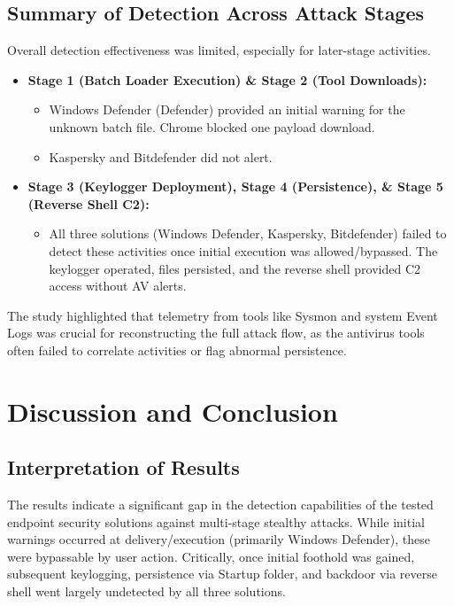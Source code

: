 \documentclass[11pt]{article}
\begin{document}
	\subsection{Summary of Detection Across Attack Stages}
	Overall detection effectiveness was limited, especially for later-stage activities.
	\begin{itemize}
		\item \textbf{Stage 1 (Batch Loader Execution) \& Stage 2 (Tool Downloads):}
		\begin{itemize}
			\item Windows Defender (Defender) provided an initial warning for the unknown batch file. Chrome blocked one payload download.
			\item Kaspersky and Bitdefender did not alert.
		\end{itemize}
		\item \textbf{Stage 3 (Keylogger Deployment), Stage 4 (Persistence), \& Stage 5 (Reverse Shell C2):}
		\begin{itemize}
			\item All three solutions (Windows Defender, Kaspersky, Bitdefender) failed to detect these activities once initial execution was allowed/bypassed. The keylogger operated, files persisted, and the reverse shell provided C2 access without AV alerts.
		\end{itemize}
	\end{itemize}
	The study highlighted that telemetry from tools like Sysmon and system Event Logs was crucial for reconstructing the full attack flow, as the antivirus tools often failed to correlate activities or flag abnormal persistence.
	
	\section{Discussion and Conclusion}
	
	\subsection{Interpretation of Results}
	The results indicate a significant gap in the detection capabilities of the tested endpoint security solutions against multi-stage stealthy attacks. While initial warnings occurred at delivery/execution (primarily Windows Defender), these were bypassable by user action. Critically, once initial foothold was gained, subsequent keylogging, persistence via Startup folder, and backdoor via reverse shell went largely undetected by all three solutions.
	
\end{document}
